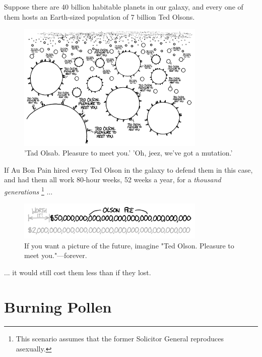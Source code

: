 {{Suppose there are 40 billion habitable planets in our galaxy, and every one of them hosts an Earth-sized population of 7 billion Ted Olsons.}

\begin{figure}[!htbp]
\centering
\includegraphics[scale=0.5, max width=0.8\textwidth]{imgs/a/96/olson.png}
\caption{'Tad Olsab. Pleasure to meet you.' 'Oh, jeez, we've got a mutation.'}
\end{figure}

{If Au Bon Pain hired every Ted Olson in the galaxy to defend them in this case, and had them all work 80-hour weeks, 52 weeks a year, for a \emph{thousand generations} {\footnote{This scenario assumes that the former Solicitor General reproduces asexually.} }...}

\begin{figure}[!htbp]
\centering
\includegraphics[scale=0.5, max width=0.8\textwidth]{imgs/a/96/final.png}
\caption{If you want a picture of the future, imagine "Ted Olson. Pleasure to meet you."—forever.}
\end{figure}

{... it would still cost them less than if they lost.}

{
\chapter{Burning Pollen}
}

}
